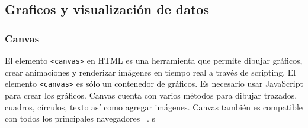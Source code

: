 \subsection{Graficos y visualización de datos}
\subsubsection{Canvas}
El elemento \texttt{<canvas>} en HTML es una herramienta que permite dibujar gráficos, crear animaciones y renderizar imágenes en tiempo real a través de scripting. El elemento \texttt{<canvas>} es sólo un contenedor de gráficos. Es necesario usar JavaScript para crear los gráficos. Canvas cuenta con varios métodos para dibujar trazados, cuadros, círculos, texto así como agregar imágenes. Canvas también es compatible con todos los principales navegadores ~\cite{CanvasHTMLW3S}.  s
%
%
